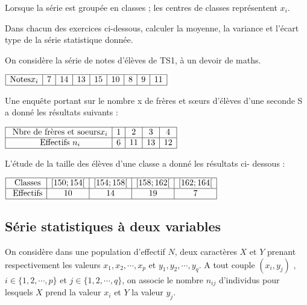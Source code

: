 \begin{remark}
 Lorsque la série est groupée en classes ; les centres de classes représentent $ x_i $.
 \end{remark}
Dans chacun des exercices  ci-dessous, calculer la moyenne, la variance et l’écart type de la série statistique donnée.


\medskip
 \begin{exercice}
 On considère la série de notes d’élèves de TS1, à un devoir de maths.

\medskip 


  $ \begin{array}{|c|c|c|c|c|c|c|c|c|}
\hline
\text{Notes}  x_{i}  & 7&  14&13&15&  10 &8 &9& 11 \\
 \hline
\end{array}$

\end{exercice} 


 \begin{exercice}
 Une enquête portant sur le nombre x de frères et sœurs d’élèves d’une seconde S a donné les résultats suivants :
 

  $ \begin{array}{|c|c|c|c|c|}
\hline
\text{ Nbre de frères et soeurs}  x_{i}  & 1&2&3&4 \\
 \hline
\text{ Effectifs } n_{i} &6&11&13&12\\
 \hline
\end{array}$
\end{exercice}


 \begin{exercice}

L'étude de la taille des élèves d’une classe a donné les résultats ci- dessous :


   $\begin{array}{|c|c|c|c|c|}
\hline
\text{ Classes} & [150 ;154[& [154  ;158[ &[158 ;162[&[162; 164[\\
 \hline
\text{ Effectifs} & 10 & 14 & 19 & 7 \\
 \hline
\end{array}$
\end{exercice}
\subsection{Série statistiques à deux variables}
On considère dans une population d’effectif $ N $, deux caractères $X$ et $Y$ prenant respectivement les valeurs  $x_1, x_2,\cdots,x_p$ et $  y_1, y_2, \cdots, y_q$. A tout couple $(x_i,y_j)$ , $i\in \{1,2,\cdots,p\}$ et $j\in \{1,2, \cdots,q\}$, on associe le nombre $n_{ij}$ d’individus pour lesquels $X$ prend la valeur $x_i$ et $Y $ la valeur $y_j$.

